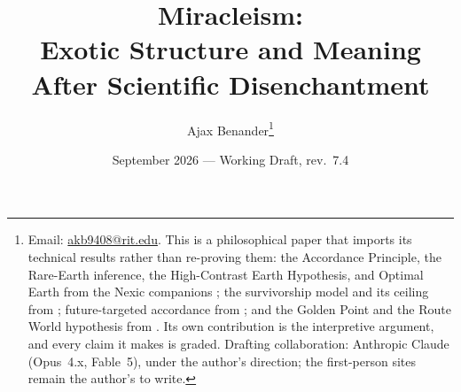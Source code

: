 \newtheorem{proposition}[theorem]{Proposition}
\newtheorem{lemma}[theorem]{Lemma}
\newtheorem{corollary}[theorem]{Corollary}
\theoremstyle{definition}
\newtheorem{definition}[theorem]{Definition}
\newtheorem{premise}{Premise}
\newtheorem{hypothesis}[theorem]{Hypothesis}
\theoremstyle{remark}
\newtheorem{remark}[theorem]{Remark}
\title{Miracleism:\\ \large Exotic Structure and Meaning After Scientific Disenchantment}
\author{Ajax Benander\thanks{Email:
\href{mailto:akb9408@rit.edu}{akb9408@rit.edu}. This is a philosophical
paper that imports its technical results rather than re-proving them:
the Accordance Principle, the Rare-Earth inference, the High-Contrast
Earth Hypothesis, and Optimal Earth from the Nexic companions
\cite{Nexus,AethusOptimalEarth}; the survivorship model and its ceiling from
\cite{GoldenSurvivorship}; future-targeted accordance from \cite{GoldenTargeted}; and the
Golden Point and the Route World hypothesis from \cite{GoldenRouteWorld}. Its
own contribution is the interpretive argument, and every claim it makes
is graded. Drafting collaboration: Anthropic Claude (Opus~4.x,
Fable~5), under the author's direction; the first-person sites remain
the author's to write.}}
\date{September 2026 --- Working Draft, rev.~7.4}

\maketitle

